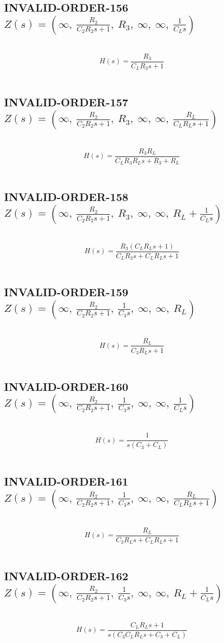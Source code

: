 \documentclass{article}
\begin{document}
\subsection{INVALID-ORDER-156 $Z(s) = \left( \infty, \  \frac{R_{2}}{C_{2} R_{2} s + 1}, \  R_{3}, \  \infty, \  \infty, \  \frac{1}{C_{L} s}\right)$ } \ 
\textbf{\[H(s) = \frac{R_{3}}{C_{L} R_{3} s + 1}\] } \ 
\subsection{INVALID-ORDER-157 $Z(s) = \left( \infty, \  \frac{R_{2}}{C_{2} R_{2} s + 1}, \  R_{3}, \  \infty, \  \infty, \  \frac{R_{L}}{C_{L} R_{L} s + 1}\right)$ } \ 
\textbf{\[H(s) = \frac{R_{3} R_{L}}{C_{L} R_{3} R_{L} s + R_{3} + R_{L}}\] } \ 
\subsection{INVALID-ORDER-158 $Z(s) = \left( \infty, \  \frac{R_{2}}{C_{2} R_{2} s + 1}, \  R_{3}, \  \infty, \  \infty, \  R_{L} + \frac{1}{C_{L} s}\right)$ } \ 
\textbf{\[H(s) = \frac{R_{3} \left(C_{L} R_{L} s + 1\right)}{C_{L} R_{3} s + C_{L} R_{L} s + 1}\] } \ 
\subsection{INVALID-ORDER-159 $Z(s) = \left( \infty, \  \frac{R_{2}}{C_{2} R_{2} s + 1}, \  \frac{1}{C_{3} s}, \  \infty, \  \infty, \  R_{L}\right)$ } \ 
\textbf{\[H(s) = \frac{R_{L}}{C_{3} R_{L} s + 1}\] } \ 
\subsection{INVALID-ORDER-160 $Z(s) = \left( \infty, \  \frac{R_{2}}{C_{2} R_{2} s + 1}, \  \frac{1}{C_{3} s}, \  \infty, \  \infty, \  \frac{1}{C_{L} s}\right)$ } \ 
\textbf{\[H(s) = \frac{1}{s \left(C_{3} + C_{L}\right)}\] } \ 
\subsection{INVALID-ORDER-161 $Z(s) = \left( \infty, \  \frac{R_{2}}{C_{2} R_{2} s + 1}, \  \frac{1}{C_{3} s}, \  \infty, \  \infty, \  \frac{R_{L}}{C_{L} R_{L} s + 1}\right)$ } \ 
\textbf{\[H(s) = \frac{R_{L}}{C_{3} R_{L} s + C_{L} R_{L} s + 1}\] } \ 
\subsection{INVALID-ORDER-162 $Z(s) = \left( \infty, \  \frac{R_{2}}{C_{2} R_{2} s + 1}, \  \frac{1}{C_{3} s}, \  \infty, \  \infty, \  R_{L} + \frac{1}{C_{L} s}\right)$ } \ 
\textbf{\[H(s) = \frac{C_{L} R_{L} s + 1}{s \left(C_{3} C_{L} R_{L} s + C_{3} + C_{L}\right)}\] } \ 
\end{document}
